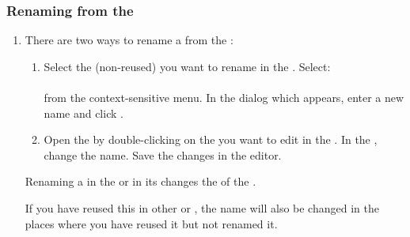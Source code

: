\subsubsection{Renaming \gdcases{} from the \gdtestcasebrowser{}}
\begin{enumerate}
\item There are two ways to rename a \gdcase{} from the \gdtestcasebrowser{}:
\begin{enumerate}
\item Select the (non-reused) \gdcase{} you want to rename in the \gdtestcasebrowser{}. Select:\\
\\
from the context-sensitive menu. In the dialog which appears, enter a new name and click . 
\item Open the \gdtestcaseeditor{} by double-clicking on the \gdcase{} you want to edit in the \gdtestcasebrowser{}.  In the \gdpropview{}, change the \gdcase{} name. Save the changes in the editor. 
\end{enumerate}

Renaming a \gdcase{} in the \gdtestcasebrowser{} or in its \gdtestcaseeditor{} changes the  of the \gdcase{}. 

If you have reused this \gdcase{} in other \gdcases{} or \gdsuites{}, the name will also be changed in the places where you have reused it but not renamed it. 


\end{enumerate}

